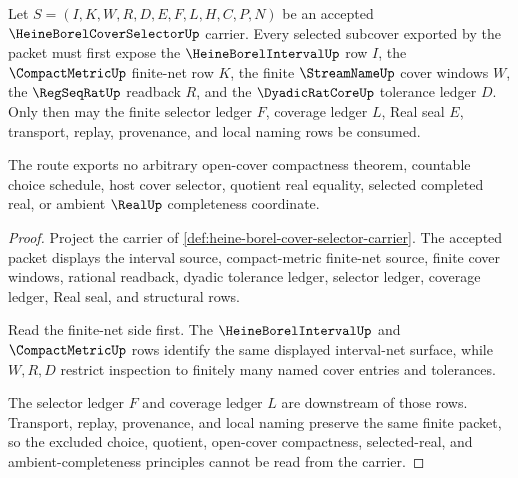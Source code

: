 \begin{theorem}
\label{thm:heine-borel-cover-selector-finite-net-subcover}
Let $S=(I,K,W,R,D,E,F,L,H,C,P,N)$ be an accepted $\HeineBorelCoverSelectorUp$ carrier. Every selected subcover exported by the packet must first expose the $\HeineBorelIntervalUp$ row $I$, the $\CompactMetricUp$ finite-net row $K$, the finite $\StreamNameUp$ cover windows $W$, the $\RegSeqRatUp$ readback $R$, and the $\DyadicRatCoreUp$ tolerance ledger $D$. Only then may the finite selector ledger $F$, coverage ledger $L$, Real seal $E$, transport, replay, provenance, and local naming rows be consumed.

The route exports no arbitrary open-cover compactness theorem, countable choice schedule, host cover selector, quotient real equality, selected completed real, or ambient $\RealUp$ completeness coordinate.
\end{theorem}
\begin{proof}
Project the carrier of \autoref{def:heine-borel-cover-selector-carrier}. The accepted packet displays the interval source, compact-metric finite-net source, finite cover windows, rational readback, dyadic tolerance ledger, selector ledger, coverage ledger, Real seal, and structural rows.

Read the finite-net side first. The $\HeineBorelIntervalUp$ and $\CompactMetricUp$ rows identify the same displayed interval-net surface, while $W,R,D$ restrict inspection to finitely many named cover entries and tolerances.

The selector ledger $F$ and coverage ledger $L$ are downstream of those rows. Transport, replay, provenance, and local naming preserve the same finite packet, so the excluded choice, quotient, open-cover compactness, selected-real, and ambient-completeness principles cannot be read from the carrier.
\end{proof}


